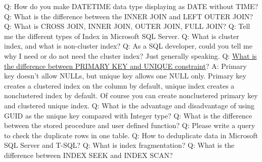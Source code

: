 \documentclass[a4paper,11pt]{article}
\begin{document}
\noindent 
Q: How do you make DATETIME data type displaying as DATE without TIME? \newline \newline
\noindent 
Q: What is the difference between the INNER JOIN and LEFT OUTER JOIN? \newline \newline
\noindent 
Q: What is CROSS JOIN, INNER JOIN, OUTER JOIN, FULL JOIN? \newline \newline
\noindent 
Q: Tell me the different types of Index in Microsoft SQL Server.\newline \newline
\noindent 
Q: What is cluster index, and what is non-cluster index?\newline \newline
\noindent 
Q: As a SQL developer, could you tell me why I need or do not need the cluster index? Just generally speaking.\newline \newline
\noindent 
Q: \ul{What is the difference between PRIMARY KEY and UNIQUE constraint}?\newline
A: Primary key doesn't allow NULLs, but unique key allows one NULL only. Primary key creates a clustered index on the column by default, unique index creates a nonclustered index by default. Of course you can create nonclustered primary key and clustered unique index.\newline\newline
\noindent 
Q: What is the advantage and disadvantage of using GUID as the unique key compared with Integer type? \newline \newline
\noindent 
Q: What is the difference between the stored procedure and user defined function? \newline \newline
\noindent 
Q: Please write a query to check the duplicate rows in one table. \newline \newline
\noindent 
Q: How to deduplicate data in Microsoft SQL Server and T-SQL? \newline \newline
\noindent 
Q: What is index fragmentation? \newline \newline
\noindent 
Q: What is the difference between INDEX SEEK and INDEX SCAN? \newline \newline
\end{document}
